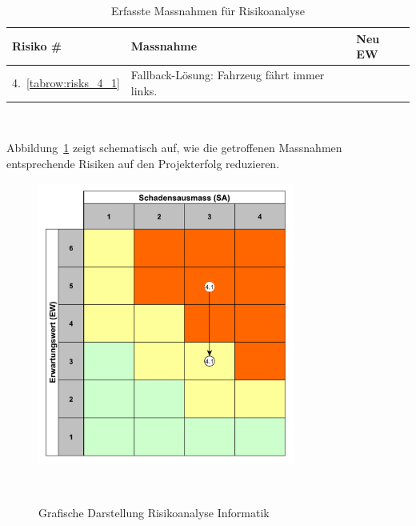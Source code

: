 \documentclass[main.tex]{subfiles} %
\begin{document}
\begin{table}[H]
    \begin{tabularx}{\textwidth}{|>{\centering\arraybackslash}p{2cm}|>{\raggedright\arraybackslash}X|>{\centering\arraybackslash}p{0.75cm}|}
        \hline
        \textbf{Risiko \#}        & \textbf{Massnahme}
                                  & \textbf{Neu EW}                              \\

        \hline
        \rowcolor{yellow!30}
        4.~\ref{tabrow:risks_4_1} & Fallback-Lösung: Fahrzeug fährt immer links.
                                  & 3                                            \\

        \hline

    \end{tabularx}
    \caption{Erfasste Massnahmen für Risikoanalyse}~\label{tab:Erfasste_Massnahmen_info}
\end{table}

Abbildung~\ref{fig:Diagramm_Risiko_info} zeigt schematisch auf, wie die
getroffenen Massnahmen entsprechende Risiken auf den Projekterfolg reduzieren.

\begin{figure}[h]
    \centering
    \includegraphics[width=0.75\textwidth]{./Risks_Diagramm/Diagramm_Risiko_info.pdf}
    \caption{Grafische Darstellung Risikoanalyse Informatik}~\label{fig:Diagramm_Risiko_info}
\end{figure}
\end{document}
